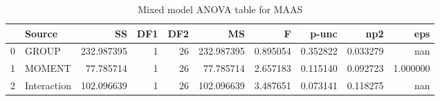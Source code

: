 \begin{table}[h]
\centering
\caption{Mixed model ANOVA table for MAAS }
\label{tab:ANOVAMixedModelMAAS}
\begin{tabular}{llrrrrrrrr}
\toprule
 & Source & SS & DF1 & DF2 & MS & F & p-unc & np2 & eps \\
\midrule
0 & GROUP & 232.987395 & 1 & 26 & 232.987395 & 0.895054 & 0.352822 & 0.033279 & nan \\
1 & MOMENT & 77.785714 & 1 & 26 & 77.785714 & 2.657183 & 0.115140 & 0.092723 & 1.000000 \\
2 & Interaction & 102.096639 & 1 & 26 & 102.096639 & 3.487651 & 0.073141 & 0.118275 & nan \\
\bottomrule
\end{tabular}
\end{table}
